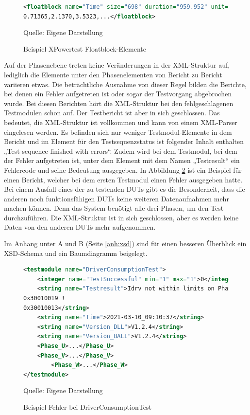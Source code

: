 \begin{figure}[H]
\centering
\begin{minipage}{0.95\textwidth}
\begin{lstlisting}[language=XML]
<floatblock name="Time" size="698" duration="959.952" unit="s">
0.71365,2.1370,3.5323,...</floatblock>
\end{lstlisting}
\end{minipage}
\caption{Beispiel XPowertest Floatblock-Elemente}
\label{fig: Beispiel XPowertest Floatblock-Elemente}
    {Quelle: Eigene Darstellung}
\end{figure}

Auf der Phasenebene treten keine Veränderungen in der \ac{XML}-Struktur auf, lediglich die Elemente unter den
Phasenelementen von Bericht zu Bericht variieren etwas.
Die beträchtliche Ausnahme von dieser Regel bilden die Berichte, bei denen ein Fehler aufgetreten ist oder sogar der
Testvorgang abgebrochen wurde. Bei diesen Berichten hört die \ac{XML}-Struktur bei den fehlgeschlagenen Testmodulen schon auf.
Der Testbericht ist aber in sich geschlossen. Das bedeutet, die \ac{XML}-Struktur ist vollkommen und kann von einem \ac{XML}-Parser eingelesen werden.
Es befinden sich nur weniger Testmodul-Elemente in dem Bericht und im Element für den Testsequenzstatus ist folgender Inhalt
enthalten „Test sequence finished with errors“. Zudem wird bei dem Testmodul, bei dem der Fehler aufgetreten ist, unter
dem Element mit dem Namen „Testresult“ ein Fehlercode und seine Bedeutung ausgegeben. In Abbildung \ref{fig: Beispiel Fehler bei DriverConsumptionTest} ist ein
Beispiel für einen Bericht, welcher bei dem ersten Testmodul einen Fehler ausgegeben hatte.
Bei einem Ausfall eines der zu testenden \ac{DUTs} gibt es die Besonderheit, dass die anderen noch funktionsfähigen \ac{DUTs}
keine weiteren Datenaufnahmen mehr machen können. Denn das System benötigt alle drei Phasen, um den Test durchzuführen.
Die \ac{XML}-Struktur ist in sich geschlossen, aber es werden keine Daten von den anderen \ac{DUTs} mehr aufgenommen.


Im Anhang unter A und B (Seite \ref{anh:xsd}) sind für einen besseren Überblick ein \ac{XSD}-Schema und ein Baumdiagramm beigelegt.

\begin{figure}[H]
\centering
\begin{minipage}{0.95\textwidth}
\begin{lstlisting}[language=XML]
<testmodule name="DriverConsumptionTest">
    <integer name="TestSuccessful" min="1" max="1">0</integer>
    <string name="Testresult">Idrv not within limits on Phase U
0x30010019 !
0x30010013</string>
    <string name="Time">2021-03-10_09:10:37</string>
    <string name="Version_DLL">V1.2.4</string>
    <string name="Version_BALI">V1.2.4</string>
    <Phase_U>...</Phase_U>
    <Phase_V>...</Phase_V>
        <Phase_W>...</Phase_W>
</testmodule>
\end{lstlisting}
\end{minipage}
\caption{Beispiel Fehler bei DriverConsumptionTest}
\label{fig: Beispiel Fehler bei DriverConsumptionTest}
    {Quelle: Eigene Darstellung}
\end{figure}

